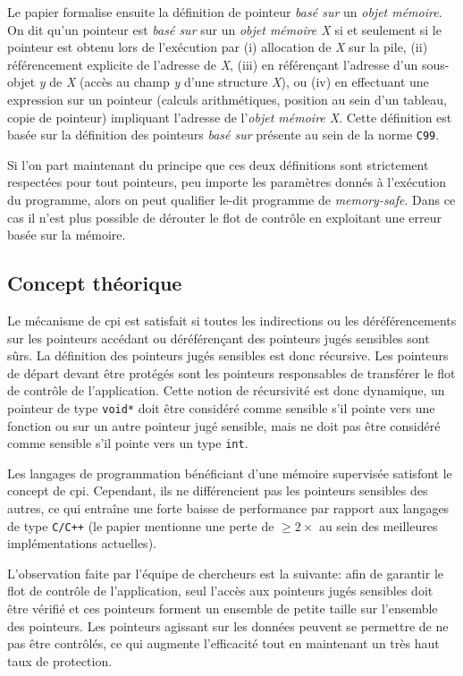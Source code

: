 Le papier formalise ensuite la définition de pointeur \textit{basé sur} un \textit{objet mémoire}. On dit qu'un pointeur est \textit{basé sur} sur un \textit{objet mémoire X} si et seulement si le pointeur est obtenu lors de l'exécution par (i) allocation de \textit{X} sur la pile, (ii) référencement explicite de l'adresse de \textit{X}, (iii) en référençant l'adresse d'un sous-objet \textit{y} de \textit{X} (accès au champ \textit{y} d'une structure \textit{X}), ou (iv) en effectuant une expression sur un pointeur (calculs arithmétiques, position au sein d'un tableau, copie de pointeur) impliquant l'adresse de l'\textit{objet mémoire X}. Cette définition est basée sur la définition des pointeurs \textit{basé sur} présente au sein de la norme \texttt{C99}.

\newpage

Si l'on part maintenant du principe que ces deux définitions sont strictement respectées pour tout pointeurs, peu importe les paramètres donnés à l'exécution du programme, alors on peut qualifier le-dit programme de \textit{memory-safe}. Dans ce cas il n'est plus possible de dérouter le flot de contrôle en exploitant une erreur basée sur la mémoire.

\subsection{Concept théorique}

Le mécanisme de \gls{cpi} est satisfait si toutes les indirections ou les déréférencements sur les pointeurs accédant ou déréférençant des pointeurs jugés \og sensibles \fg sont sûrs. La définition des pointeurs jugés sensibles est donc récursive. Les pointeurs de départ devant être protégés sont les pointeurs responsables de transférer le flot de contrôle de l'application. Cette notion de récursivité est donc dynamique, un pointeur de type \texttt{void*} doit être considéré comme sensible s'il pointe vers une fonction ou sur un autre pointeur jugé sensible, mais ne doit pas être considéré comme sensible s'il pointe vers un type \texttt{int}.

Les langages de programmation bénéficiant d'une mémoire supervisée satisfont le concept de \gls{cpi}. Cependant, ils ne différencient pas les pointeurs sensibles des autres, ce qui entraîne une forte baisse de performance par rapport aux langages de type \texttt{C/C++} (le papier mentionne une perte de $\geq2\times$ au sein des meilleures implémentations actuelles).

L'observation faite par l'équipe de chercheurs est la suivante: afin de garantir le flot de contrôle de l'application, seul l'accès aux pointeurs jugés sensibles doit être vérifié et ces pointeurs forment un ensemble de petite taille sur l'ensemble des pointeurs. Les pointeurs agissant sur les données peuvent se permettre de ne pas être contrôlés, ce qui augmente l'efficacité tout en maintenant un très haut taux de protection.

